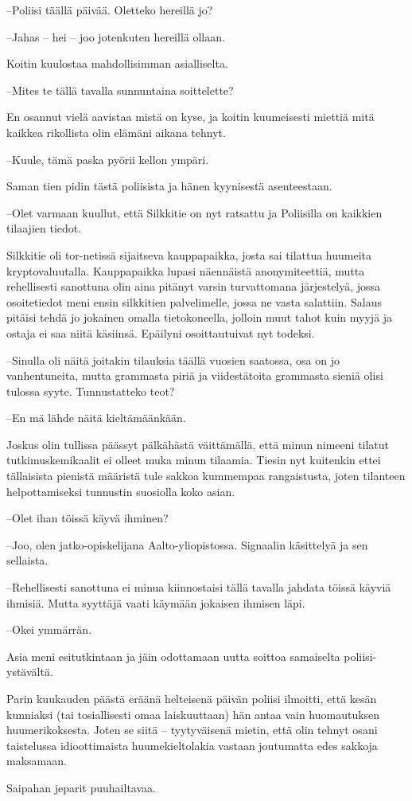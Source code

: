 \documentclass{tsnovel}
\begin{document}
–Poliisi täällä päivää. Oletteko hereillä jo?

–Jahas – hei – joo jotenkuten hereillä ollaan.

Koitin kuulostaa mahdollisimman asialliselta.

–Mites te tällä tavalla sunnuntaina soittelette?

En osannut vielä aavistaa mistä on kyse, ja koitin kuumeisesti miettiä mitä kaikkea rikollista olin elämäni aikana tehnyt.

–Kuule, tämä paska pyörii kellon ympäri.

Saman tien pidin tästä poliisista ja hänen kyynisestä asenteestaan.

–Olet varmaan kuullut, että Silkkitie on nyt ratsattu ja Poliisilla on kaikkien tilaajien tiedot.

Silkkitie oli tor-netissä sijaitseva kauppapaikka, josta sai tilattua huumeita kryptovaluutalla. Kauppapaikka lupasi näennäistä anonymiteettiä, mutta rehellisesti sanottuna olin aina pitänyt varsin turvattomana järjestelyä, jossa osoitetiedot meni ensin silkkitien palvelimelle, jossa ne vasta salattiin. Salaus pitäisi tehdä jo jokainen omalla tietokoneella, jolloin muut tahot kuin myyjä ja ostaja  ei saa niitä käsiinsä. Epäilyni osoittautuivat nyt todeksi.

–Sinulla oli näitä joitakin tilauksia täällä vuosien saatossa, osa on jo vanhentuneita, mutta grammasta piriä ja viidestätoita grammasta sieniä olisi tulossa syyte. Tunnustatteko teot?

–En mä lähde näitä kieltämäänkään.

Joskus olin tullissa päässyt pälkähästä väittämällä, että minun nimeeni tilatut tutkimuskemikaalit ei olleet muka minun tilaamia. Tiesin nyt kuitenkin ettei tällaisista pienistä määristä tule sakkoa kummempaa rangaistusta, joten tilanteen helpottamiseksi tunnustin suosiolla koko asian.

–Olet ihan töissä käyvä ihminen?

–Joo, olen jatko-opiskelijana Aalto-yliopistossa. Signaalin käsittelyä ja sen sellaista.

–Rehellisesti sanottuna ei minua kiinnostaisi tällä tavalla jahdata töissä käyviä ihmisiä. Mutta syyttäjä vaati käymään jokaisen ihmisen läpi.

–Okei ymmärrän.

Asia meni esitutkintaan ja jäin odottamaan uutta soittoa samaiselta poliisi-ystävältä.


Parin kuukauden päästä eräänä helteisenä päivän poliisi ilmoitti, että kesän kunniaksi (tai tosiallisesti omaa laiskuuttaan) hän antaa vain huomautuksen huumerikoksesta. Joten se siitä – tyytyväisenä mietin, että olin tehnyt osani taistelussa idioottimaista huumekieltolakia vastaan joutumatta edes sakkoja maksamaan.

Saipahan jeparit puuhailtavaa.


\section{}
\end{document}
